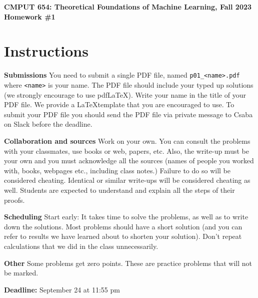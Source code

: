 \documentclass{article}
\newcommand{\hwnumber}{1}
\DeclareMathOperator*{\1}{\mathbbm{1}}
\theoremstyle{definition}
\theoremstyle{remark}
\begin{document}
\begin{center}
{\Large \textbf{CMPUT 654: Theoretical Foundations of Machine Learning, Fall 2023\\ Homework \#\hwnumber}}
\end{center}

\section*{Instructions}
\textbf{Submissions}
You need to submit a single PDF file, named {\tt p0\hwnumber\_<name>.pdf} where {\tt <name>} is your name.
The PDF file should include your typed up solutions (we strongly encourage to use pdf\LaTeX). 
Write your name in the title of your PDF file.
We provide a \LaTeX template that you are encouraged to use.
To submit your PDF file you should send the PDF file via private message to Csaba on Slack before the deadline.


\textbf{Collaboration and sources}
Work on your own. You can consult the problems with your classmates, use books
or web, papers, etc.
Also, the write-up must be your own and you must acknowledge all the
sources (names of people you worked with, books, webpages etc., including class notes.) 
Failure to do so will be considered cheating.  
Identical or similar write-ups will be considered cheating as well.
Students are expected to understand and explain all the steps of their proofs.

\textbf{Scheduling}
Start early: It takes time to solve the problems, as well as to write down the solutions. Most problems should have a short solution (and you can refer to results we have learned about to shorten your solution). Don't repeat calculations that we did in the class unnecessarily.

\textbf{Other}
Some problems get zero points. These are practice problems that will not be marked.

\vspace{0.3cm}

\textbf{Deadline:} September 24 at 11:55 pm

\newcommand{\cM}{\mathcal{M}}
\newcommand{\nS}{\mathrm{S}}
\newcommand{\nA}{\mathrm{A}}
\newcommand{\PP}{\mathbb{P}}
\newcommand{\RR}{\mathbb{R}}
\newcommand{\cX}{\mathcal{X}}
\newcommand{\cY}{\mathcal{Y}}
\newcommand{\cZ}{\mathcal{Z}}
\newcommand{\cD}{\mathcal{D}}
\newcommand{\cN}{\mathcal{N}}
\newcommand{\ip}[1]{\langle #1 \rangle}
\newcommand{\one}[1]{\mathbb{I}\{#1\}}
\newcommand{\KL}{\mathrm{KL}}
\end{document}
